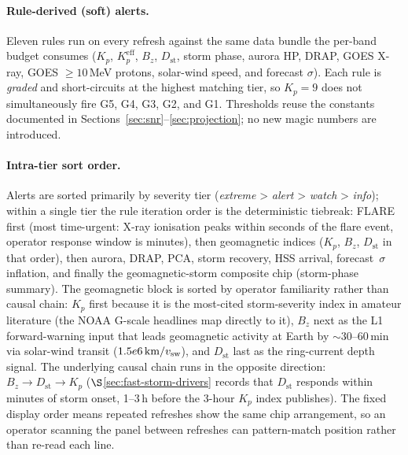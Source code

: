\documentclass[11pt,a4paper]{article}
\newcommand{\SI}[2]{#1\,\text{#2}}
\newcommand{\km}{\text{km}}
\begin{document}
\paragraph{Rule-derived (soft) alerts.}  Eleven rules run on
every refresh against the same data bundle the per-band budget
consumes ($K_p$, $K_p^{\text{eff}}$, $B_z$, $D_{\text{st}}$,
storm phase, aurora HP, DRAP, GOES X-ray, GOES $\ge 10$\,MeV
protons, solar-wind speed, and forecast $\sigma$).  Each rule
is \emph{graded} and short-circuits at the highest matching
tier, so $K_p = 9$ does not simultaneously fire G5, G4, G3, G2,
and G1.  Thresholds reuse the constants documented in
Sections~\ref{sec:snr}--\ref{sec:projection}; no new magic
numbers are introduced.

\paragraph{Intra-tier sort order.}  Alerts are sorted primarily
by severity tier (\emph{extreme} > \emph{alert} > \emph{watch} >
\emph{info}); within a single tier the rule iteration order is
the deterministic tiebreak: FLARE first (most time-urgent:
X-ray ionisation peaks within seconds of the flare event,
operator response window is minutes), then geomagnetic indices
($K_p$, $B_z$, $D_{\text{st}}$ in that order), then aurora,
DRAP, PCA, storm recovery, HSS arrival, forecast~$\sigma$
inflation, and finally the geomagnetic-storm composite chip
(storm-phase summary).  The geomagnetic block is sorted by
operator familiarity rather than causal chain: $K_p$ first
because it is the most-cited storm-severity index in amateur
literature (the NOAA G-scale headlines map directly to it),
$B_z$ next as the L1 forward-warning input that leads
geomagnetic activity at Earth by ${\sim}30$--$60$\,min via
solar-wind transit ($\SI{1.5e6}{\km}/v_{\text{sw}}$), and
$D_{\text{st}}$ last as the ring-current depth signal.  The
underlying causal chain runs in the opposite direction:
$B_z \to D_{\text{st}} \to K_p$ ($\S$\ref{sec:fast-storm-drivers}
records that $D_{\text{st}}$ responds within minutes of storm
onset, 1--3\,h before the 3-hour $K_p$ index publishes).  The
fixed display order means repeated refreshes show the same chip
arrangement, so an operator scanning the panel between refreshes
can pattern-match position rather than re-read each line.
\end{document}
